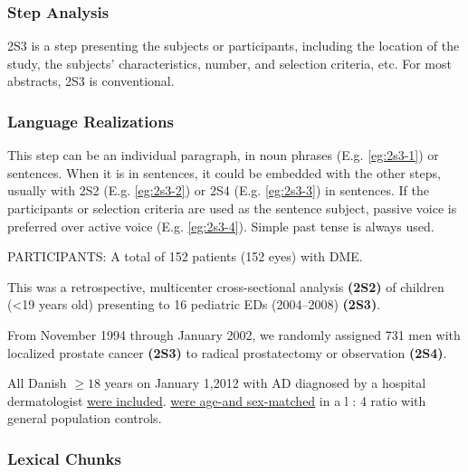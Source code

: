 \documentclass{ctexbook}
\begin{document}
    \subsubsection{Step Analysis}

    2S3 is a step presenting the subjects or participants, including the location of the study, the subjects' characteristics, number, and selection criteria, etc. For most abstracts, 2S3 is conventional.

    \subsubsection{Language Realizations}

    This step can be an individual paragraph, in noun phrases (E.g. \ref{eg:2s3-1}) or sentences. When it is in sentences, it could be embedded with the other steps, usually with 2S2 (E.g. \ref{eg:2s3-2}) or 2S4 (E.g. \ref{eg:2s3-3}) in sentences. If the participants or selection criteria are used as the sentence subject, passive voice is preferred over active voice (E.g. \ref{eg:2s3-4}). Simple past tense is always used.

    \begin{eg}[label={eg:2s3-1}]{}
      PARTICIPANTS: A total of 152 patients (152 eyes) with DME.
    \end{eg}

    \begin{eg}[label={eg:2s3-2}]{}
      This was a retrospective, multicenter cross-sectional analysis \textbf{(2S2)} of children (<19 years old) presenting to 16 pediatric EDs (2004--2008) \textbf{(2S3)}.
    \end{eg}

    \begin{eg}[label={eg:2s3-3}]{}
      From November 1994 through January 2002, we randomly assigned 731 men with localized prostate cancer \textbf{(2S3)} to radical prostatectomy or observation \textbf{(2S4)}.
    \end{eg}

    \begin{eg}[label={eg:2s3-4}]{}
      All Danish  $\geqslant 18$ years on January 1,2012 with AD diagnosed by a hospital dermatologist \uline{were included}.  \uline{were age-and sex-matched} in a l : 4 ratio with general population controls.
    \end{eg}

    \subsubsection{Lexical Chunks}
\end{document}
